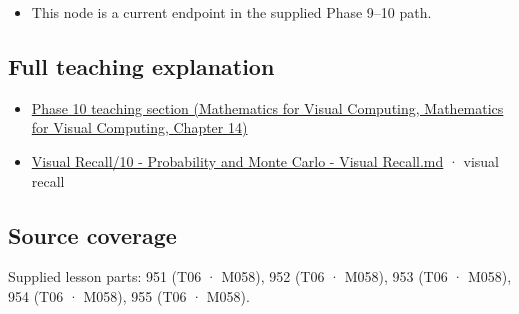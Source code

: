 \begin{itemize}
\tightlist
\item
  This node is a current endpoint in the supplied Phase 9--10 path.
\end{itemize}

\subsection{Full teaching explanation}\label{appendix-33237f0f618b-full-teaching-explanation}

\begin{itemize}
\tightlist
\item
  \href{../02-Mathematics-for-Visual-Computing/main.pdf\#nameddest=02-foundations-ii-ch030-finite-samples-need-stable-descriptive-statistics}{Phase 10 teaching section (Mathematics for Visual Computing, Mathematics for Visual Computing, Chapter 14)}
\item
  \hyperref[appendix-cb5af353ef77]{Visual Recall/10 - Probability and Monte Carlo - Visual Recall.md} · visual recall
\end{itemize}

\subsection{Source coverage}\label{appendix-33237f0f618b-source-coverage}

Supplied lesson parts: 951 (T06 · M058), 952 (T06 · M058), 953 (T06 · M058), 954 (T06 · M058), 955 (T06 · M058).
